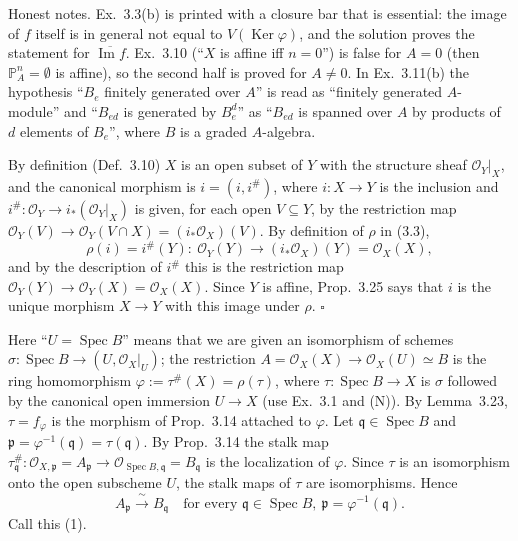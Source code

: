 \documentclass[11pt]{article}
\begin{document}
Honest notes. Ex.~3.3(b) is printed with a closure bar that is essential: the image of $f$ itself is in general not equal to $V(\operatorname{Ker}\varphi)$, and the solution proves the statement for $\overline{\operatorname{Im} f}$. Ex.~3.10 (``$X$ is affine iff $n=0$'') is false for $A=0$ (then $\mathbb{P}^n_A=\emptyset$ is affine), so the second half is proved for $A\neq0$. In Ex.~3.11(b) the hypothesis ``$B_e$ finitely generated over $A$'' is read as ``finitely generated $A$-module'' and ``$B_{ed}$ is generated by $B_e^d$'' as ``$B_{ed}$ is spanned over $A$ by products of $d$ elements of $B_e$'', where $B$ is a graded $A$-algebra.

\pf
By definition (Def.~3.10) $X$ is an open subset of $Y$ with the structure sheaf $\mathcal{O}_Y|_X$, and the canonical morphism is $i=(i,i^{\#})$, where $i:X\to Y$ is the inclusion and $i^{\#}:\mathcal{O}_Y\to i_*(\mathcal{O}_Y|_X)$ is given, for each open $V\subseteq Y$, by the restriction map $\mathcal{O}_Y(V)\to\mathcal{O}_Y(V\cap X)=(i_*\mathcal{O}_X)(V)$. By definition of $\rho$ in (3.3),
\[ \rho(i)=i^{\#}(Y):\ \mathcal{O}_Y(Y)\longrightarrow (i_*\mathcal{O}_X)(Y)=\mathcal{O}_X(X), \]
and by the description of $i^{\#}$ this is the restriction map $\mathcal{O}_Y(Y)\to\mathcal{O}_Y(X)=\mathcal{O}_X(X)$. Since $Y$ is affine, Prop.~3.25 says that $i$ is the unique morphism $X\to Y$ with this image under $\rho$. \hfill$\square$

\pf
Here ``$U=\operatorname{Spec}B$'' means that we are given an isomorphism of schemes $\sigma:\operatorname{Spec}B\to(U,\mathcal{O}_X|_U)$; the restriction $A=\mathcal{O}_X(X)\to\mathcal{O}_X(U)\simeq B$ is the ring homomorphism $\varphi:=\tau^{\#}(X)=\rho(\tau)$, where $\tau:\operatorname{Spec}B\to X$ is $\sigma$ followed by the canonical open immersion $U\to X$ (use Ex.~3.1 and (N)). By Lemma~3.23, $\tau=f_\varphi$ is the morphism of Prop.~3.14 attached to $\varphi$. Let $\mathfrak{q}\in\operatorname{Spec}B$ and $\mathfrak{p}=\varphi^{-1}(\mathfrak{q})=\tau(\mathfrak{q})$. By Prop.~3.14 the stalk map $\tau^{\#}_{\mathfrak{q}}:\mathcal{O}_{X,\mathfrak{p}}=A_{\mathfrak{p}}\to\mathcal{O}_{\operatorname{Spec}B,\mathfrak{q}}=B_{\mathfrak{q}}$ is the localization of $\varphi$. Since $\tau$ is an isomorphism onto the open subscheme $U$, the stalk maps of $\tau$ are isomorphisms. Hence
\[ A_{\mathfrak{p}}\xrightarrow{\ \sim\ }B_{\mathfrak{q}}\quad\text{for every }\mathfrak{q}\in\operatorname{Spec}B,\ \mathfrak{p}=\varphi^{-1}(\mathfrak{q}). \]
Call this (1).
\end{document}
